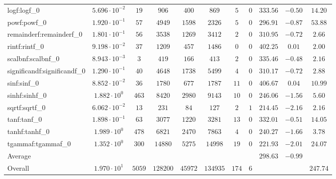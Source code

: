 \begin{tabular}{|l|c|c|c|c|c|c|c|c|c|c|}
logf:logf\_0                 & $ 5.696 \cdot 10^{-2} $ & $ 19     $ & $ 906    $ & $ 400   $ & $ 869    $ & $ 5   $ & $ 0 $ & $ 333.56      $ & $ -0.50   $ & $ 14.20   $ \\
powf:powf\_0                 & $ 1.920 \cdot 10^{-1} $ & $ 57     $ & $ 4949   $ & $ 1598  $ & $ 2326   $ & $ 5   $ & $ 0 $ & $ 296.91      $ & $ -0.87   $ & $ 53.88   $ \\
remainderf:remainderf\_0     & $ 1.801 \cdot 10^{-1} $ & $ 56     $ & $ 3538   $ & $ 1269  $ & $ 3412   $ & $ 2   $ & $ 0 $ & $ 310.95      $ & $ -0.72   $ & $ 2.66    $ \\
rintf:rintf\_0               & $ 9.198 \cdot 10^{-2} $ & $ 37     $ & $ 1209   $ & $ 457   $ & $ 1486   $ & $ 0   $ & $ 0 $ & $ 402.25      $ & $ 0.01    $ & $ 2.00    $ \\
scalbnf:scalbnf\_0           & $ 8.943 \cdot 10^{-3} $ & $ 3      $ & $ 419    $ & $ 166   $ & $ 413    $ & $ 2   $ & $ 0 $ & $ 335.46      $ & $ -0.48   $ & $ 2.16    $ \\
significandf:significandf\_0 & $ 1.290 \cdot 10^{-1} $ & $ 40     $ & $ 4648   $ & $ 1738  $ & $ 5499   $ & $ 4   $ & $ 0 $ & $ 310.17      $ & $ -0.72   $ & $ 2.88    $ \\
sinf:sinf\_0                 & $ 8.852 \cdot 10^{-2} $ & $ 36     $ & $ 1780   $ & $ 677   $ & $ 1787   $ & $ 11  $ & $ 0 $ & $ 406.67      $ & $ 0.04    $ & $ 10.99   $ \\
sinhf:sinhf\_0               & $ 1.882 \cdot 10^{0}  $ & $ 463    $ & $ 8420   $ & $ 2980  $ & $ 9143   $ & $ 10  $ & $ 0 $ & $ 246.06      $ & $ -1.56   $ & $ 5.60    $ \\
sqrtf:sqrtf\_0               & $ 6.062 \cdot 10^{-2} $ & $ 13     $ & $ 231    $ & $ 84    $ & $ 127    $ & $ 2   $ & $ 1 $ & $ 214.45      $ & $ -2.16   $ & $ 2.16    $ \\
tanf:tanf\_0                 & $ 1.898 \cdot 10^{-1} $ & $ 63     $ & $ 3077   $ & $ 1220  $ & $ 3281   $ & $ 13  $ & $ 0 $ & $ 332.01      $ & $ -0.51   $ & $ 14.05   $ \\
tanhf:tanhf\_0               & $ 1.989 \cdot 10^{0}  $ & $ 478    $ & $ 6821   $ & $ 2470  $ & $ 7863   $ & $ 4   $ & $ 0 $ & $ 240.27      $ & $ -1.66   $ & $ 3.78    $ \\
tgammaf:tgammaf\_0           & $ 1.352 \cdot 10^{0}  $ & $ 300    $ & $ 14880  $ & $ 5275  $ & $ 14998  $ & $ 19  $ & $ 0 $ & $ 221.93      $ & $ -2.01   $ & $ 24.07   $ \\
\hline
Average                      & $                     $ & $        $ & $        $ & $       $ & $        $ & $     $ & $   $ & $ 298.63      $ & $ -0.99   $ & $         $ \\
\hline
Overall                      & $ 1.970 \cdot 10^{1}  $ & $ 5059   $ & $ 128200 $ & $ 45972 $ & $ 134935 $ & $ 174 $ & $ 6 $ & $             $ & $         $ & $ 247.74  $ \\
\hline
\end{tabular}
